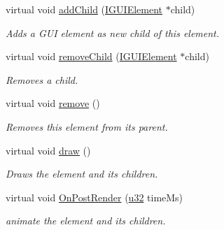 \begin{DoxyCompactItemize}
virtual void \hyperlink{classirr_1_1gui_1_1IGUIElement_a221c8505217aa9c23c621627a0435554}{add\+Child} (\hyperlink{classirr_1_1gui_1_1IGUIElement}{I\+G\+U\+I\+Element} $\ast$child)
\begin{DoxyCompactList}\small\item\em Adds a G\+UI element as new child of this element. \end{DoxyCompactList}\item 
\mbox{\label{classirr_1_1gui_1_1IGUIElement_a3171cafaa9d2f3b67c886c60bdd61b32}} 
virtual void \hyperlink{classirr_1_1gui_1_1IGUIElement_a3171cafaa9d2f3b67c886c60bdd61b32}{remove\+Child} (\hyperlink{classirr_1_1gui_1_1IGUIElement}{I\+G\+U\+I\+Element} $\ast$child)
\begin{DoxyCompactList}\small\item\em Removes a child. \end{DoxyCompactList}\item 
\mbox{\label{classirr_1_1gui_1_1IGUIElement_af8fb8c63d48ec6ceeeedc8a83c02a9d0}} 
virtual void \hyperlink{classirr_1_1gui_1_1IGUIElement_af8fb8c63d48ec6ceeeedc8a83c02a9d0}{remove} ()
\begin{DoxyCompactList}\small\item\em Removes this element from its parent. \end{DoxyCompactList}\item 
\mbox{\label{classirr_1_1gui_1_1IGUIElement_a1ef7eeaff67b8a9f4f37cacdc7e54be2}} 
virtual void \hyperlink{classirr_1_1gui_1_1IGUIElement_a1ef7eeaff67b8a9f4f37cacdc7e54be2}{draw} ()
\begin{DoxyCompactList}\small\item\em Draws the element and its children. \end{DoxyCompactList}\item 
\mbox{\label{classirr_1_1gui_1_1IGUIElement_ac71cf9174d4d35eca386657f01d744d1}} 
virtual void \hyperlink{classirr_1_1gui_1_1IGUIElement_ac71cf9174d4d35eca386657f01d744d1}{On\+Post\+Render} (\hyperlink{namespaceirr_a0416a53257075833e7002efd0a18e804}{u32} time\+Ms)
\begin{DoxyCompactList}\small\item\em animate the element and its children. \end{DoxyCompactList}\item 

\end{DoxyCompactItemize}
